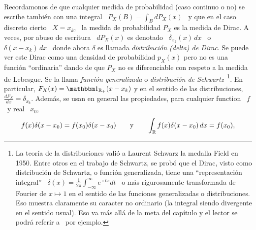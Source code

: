 
Recordamonos de  que cualquier  medida de probabilidad  (caso continuo o  no) se
escribe tambi\'en con una integral \ $\displaystyle P_X(B) = \int_B dP_X(x)$ \ y
que en el caso discreto cierto \ $X = x_k$, \ la medida de probabilidad $P_X$ es
la medida de  Dirac. A veces, por  abuso de escritura \ $dP_X(x)$  es denotado \
$\delta_{x_k}(x) \,  dx$ \ o \ $\delta(x-x_k)  \, dx$ \ donde  ahora $\delta$ es
llamada {\it distribuci\'on (delta) de Dirac}.  Se puede ver este Dirac como una
densidad de  probabilidad $p_X(x)$ \modif{con  respeto a la medida  de Lebesgue}
pero no  es una funci\'on ``ordinaria''  dando de que $P_X$  no es diferenciable
con respeto a la medida de Lebesgue.  Se la llama {\it funci\'on generalizada} o
{\it  distribuci\'on  de Schwartz}~\footnote{La  teor\'ia  de la  distribuciones
  vali\'o a Laurent Schwarz la medalla Field en 1950.  Entre otros en el trabajo
  de Schwartz, se prob\'o que el Dirac, visto como distribuci\'on de Schwartz, o
  funci\'on   generalizada,   tiene    una   ``representaci\'on   integral''   \
  $\displaystyle \delta(x) =  \frac{1}{2\pi} \int_{-\infty}^{\infty} e^{\imath t
    x} dt$ \  o m\'as rigurosamente transformada de Fourier de  $x \mapsto 1$ en
  el  sentido de  las  funciones generalizadas  o  distribuciones.  Eso  muestra
  claramente  su caracter  no ordinario  (la  integral siendo  divergente en  el
  sentido usual).  Eso va m\'as all\'a de  la meta del cap\'itulo y el lector se
  podr\'a  referir   a~\cite{Sch66,  GelShi64,  GelShi68}   por  ejemplo.}.   En
particular,   $F_X(x)  =   \un_{\Rset_+}(x-x_k)$  y   en  el   sentido   de  las
distribuciones, $\frac{d F_X}{dx} = \delta_{x_k}$.  Adem\'as, se usan en general
las propiedades, para cualquier function \ $f$ \ y real \ $x_0$,
%
\[
f(x) \delta(x-x_0) = f(x_0) \delta(x-x_0) \qquad \mbox{y} \qquad \int_{\mathbb{R}} f(x)
\delta(x-x_0) \, dx = f(x_0),
\]
